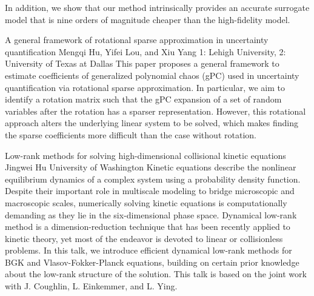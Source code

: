 \begin{addmargin}[2em]{0em}
{In addition, we show that our method intrinsically provides an accurate surrogate model that is nine orders of magnitude cheaper than the high-fidelity model.}


\vspace{1.5ex}
\abs
{A general framework of rotational sparse approximation in uncertainty quantification}
{Mengqi Hu, Yifei Lou, and Xiu Yang}
{1: Lehigh University, 2: University of Texas at Dallas}
{This paper proposes a general framework to estimate coefficients of generalized  polynomial chaos (gPC) used in uncertainty quantification via rotational sparse approximation. In particular, we aim to identify a rotation matrix such that the gPC expansion of a set of random variables after the rotation has a sparser representation. However, this rotational approach alters the underlying linear system to be solved, which makes finding the sparse coefficients more difficult than the case without rotation.}


\vspace{1.5ex}
\abs
{Low-rank methods for solving high-dimensional collisional kinetic equations}
{Jingwei Hu}
{University of Washington}
{Kinetic equations describe the nonlinear equilibrium dynamics of a complex system using a probability density function. Despite their important role in multiscale modeling to bridge microscopic and macroscopic scales, numerically solving kinetic equations is computationally demanding as they lie in the six-dimensional phase space. Dynamical low-rank method is a dimension-reduction technique that has been recently applied to kinetic theory, yet most of the endeavor is devoted to linear or collisionless problems. In this talk, we introduce efficient dynamical low-rank methods for BGK and Vlasov-Fokker-Planck equations, building on certain prior knowledge about the low-rank structure of the solution. This talk is based on the joint work with J. Coughlin, L. Einkemmer, and L. Ying.}



\end{addmargin}
